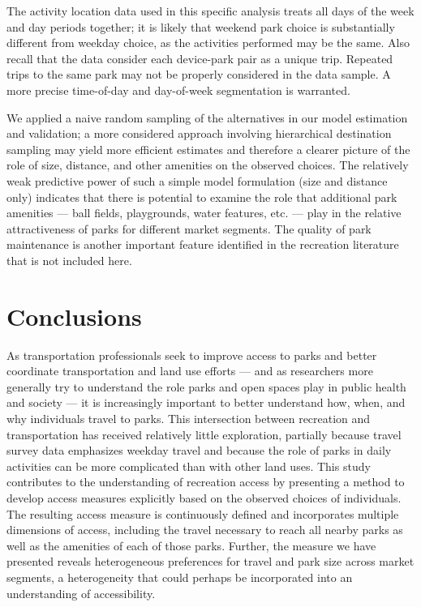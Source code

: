 \documentclass[3p, authoryear]{elsarticle} %
\begin{document}
The activity location data used in this specific analysis treats all days of the
week and day periods together; it is likely that weekend park choice is
substantially different from weekday choice, as the activities performed may be
the same. Also recall that the data consider each device-park pair as a unique
trip. Repeated trips to the same park may not be properly considered in the data
sample. A more precise time-of-day and day-of-week segmentation is warranted.

We applied a naive random sampling of the alternatives in our model estimation
and validation; a more considered approach involving hierarchical destination
sampling may yield more efficient estimates and therefore a clearer picture of
the role of size, distance, and other amenities on the observed choices. The
relatively weak predictive power of such a simple model formulation (size and
distance only) indicates that there is potential to examine the role that
additional park amenities --- ball fields, playgrounds, water features, etc. ---
play in the relative attractiveness of parks for different market segments. The
quality of park maintenance is another important feature identified in the
recreation literature \citep{Fletcher2003} that is not included here.

\hypertarget{conclusions}{%
\section{Conclusions}\label{conclusions}}

As transportation professionals seek to improve access to parks and better
coordinate transportation and land use efforts --- and as researchers more
generally try to understand the role parks and open spaces play in public health
and society --- it is increasingly important to better understand how, when, and
why individuals travel to parks. This intersection between recreation and
transportation has received relatively little exploration, partially because
travel survey data emphasizes weekday travel and because the role of parks in
daily activities can be more complicated than with other land uses. This study
contributes to the understanding of recreation access by presenting a method to
develop access measures explicitly based on the observed choices of individuals.
The resulting access measure is continuously defined and incorporates multiple
dimensions of access, including the travel necessary to reach all nearby parks
as well as the amenities of each of those parks. Further, the measure we have
presented reveals heterogeneous preferences for travel and park size across
market segments, a heterogeneity that could perhaps be incorporated into an
understanding of accessibility.
\end{document}
